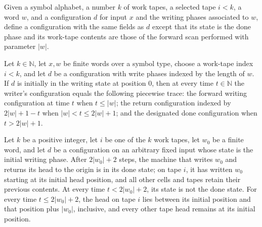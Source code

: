 \begin{definition}
\label{Turing.scanConstD}
\leanok
{}
Given a symbol alphabet, a number $k$ of work tapes, a selected tape $i<k$, a word $w$,
and a configuration $d$ for input $x$ and the writing phases associated to $w$, define a
configuration with the same fields as $d$ except that its state is the done phase and
its work-tape contents are those of the forward scan performed with parameter $|w|$.
\end{definition}

\begin{theorem}
\label{Turing.scan_const_trace}
\leanok
{}
Let $k\in\mathbb N$, let $x,w$ be finite words over a symbol type, choose a work-tape
index $i<k$, and let $d$ be a configuration with write phases indexed by the length of
$w$. If $d$ is initially in the writing state at position $0$, then at every time
$t\in\mathbb N$ the writer's configuration equals the following piecewise trace: the
forward writing configuration at time $t$ when $t\le |w|$; the return configuration
indexed by $2|w|+1-t$ when $|w|<t\le 2|w|+1$; and the designated done configuration when
$t>2|w|+1$.
\end{theorem}

\begin{theorem}
\label{Turing.writeConstTM_run_ofCfg}
\leanok
{}
Let $k$ be a positive integer, let $i$ be one of the $k$ work tapes, let $w_0$ be a
finite word, and let $d$ be a configuration on an arbitrary fixed input whose state is
the initial writing phase. After $2|w_0|+2$ steps, the machine that writes $w_0$ and
returns its head to the origin is in its done state; on tape $i$, it has written $w_0$
starting at its initial head position, and all other cells and tapes retain their
previous contents. At every time $t<2|w_0|+2$, its state is not the done state. For
every time $t\le 2|w_0|+2$, the head on tape $i$ lies between its initial position and
that position plus $|w_0|$, inclusive, and every other tape head remains at its initial
position.
\end{theorem}

